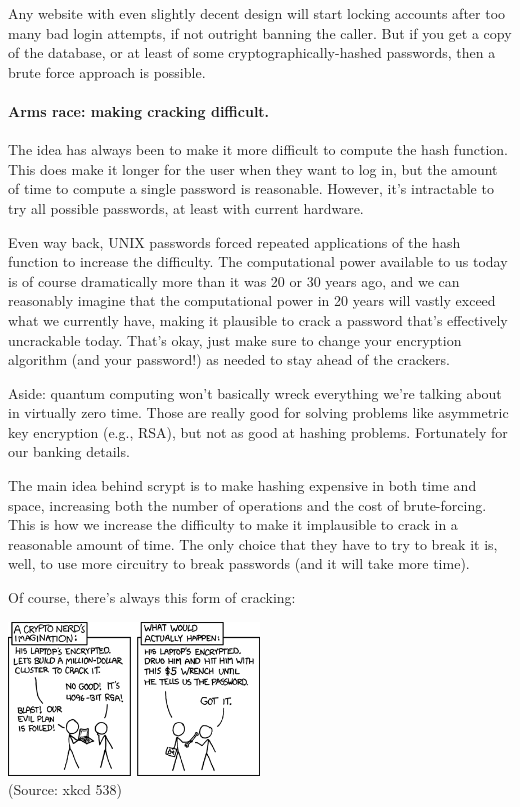 \documentclass[a4paper]{report}
\begin{document}
Any website with even slightly decent design will start locking accounts after too many bad login attempts, if not outright banning the caller. But if you get a copy of the database, or at least of some cryptographically-hashed passwords, then a brute force approach is possible.

\paragraph{Arms race: making cracking difficult.} The idea has always been
to make it more difficult to compute the hash function. This does make it longer for the user when they want to log in, but the amount of time to compute a single password is reasonable. However, it's intractable to try all possible passwords, at least with current hardware. 

Even way back,
UNIX passwords forced repeated applications of the hash function to increase the difficulty. The computational power available to us today is of course dramatically more than it was 20 or 30 years ago, and we can reasonably imagine that the computational power in 20 years will vastly exceed what we currently have, making it plausible to crack a password that's effectively uncrackable today. That's okay, just make sure to change your encryption algorithm (and your password!) as needed to stay ahead of the crackers.

Aside: quantum computing won't basically wreck everything we're talking about in virtually zero time. Those are really good for solving problems like asymmetric key encryption (e.g., RSA), but not as good at hashing problems. Fortunately for our banking details.

The main idea behind scrypt is to make hashing expensive in both time and space,
increasing both the number of operations and the cost of brute-forcing. This is how we increase the difficulty to make it implausible to crack in a reasonable amount of time. The only choice that they have to try to break it is, well, to use more circuitry to break passwords (and it will take more time).

Of course, there's always this form of cracking:
\begin{center}
\includegraphics[width=0.5\textwidth]{images/xkcd-538}\\
\hfill (Source: xkcd 538)
\end{center}
\end{document}

